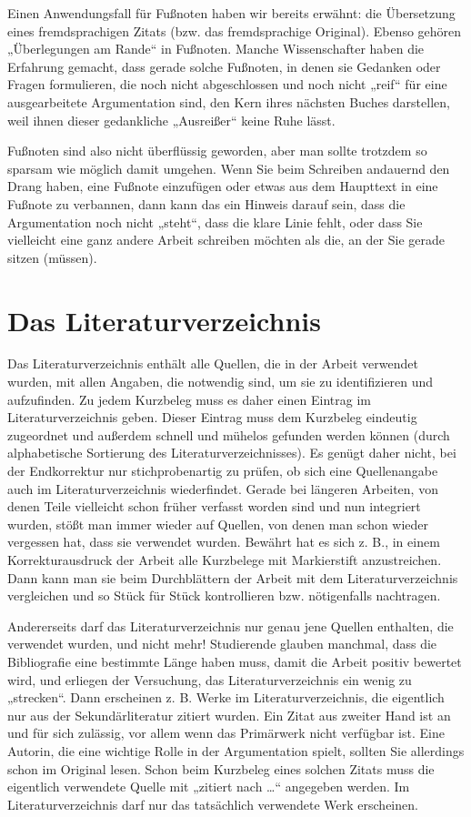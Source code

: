 \documentclass[]{book}
\theoremstyle{definition}
\theoremstyle{definition}
\theoremstyle{definition}
\theoremstyle{remark}
\begin{document}
Einen Anwendungsfall für Fußnoten haben wir bereits erwähnt: die
Übersetzung eines fremdsprachigen Zitats (bzw. das fremdsprachige
Original). Ebenso gehören „Überlegungen am Rande`` in Fußnoten. Manche
Wissenschafter haben die Erfahrung gemacht, dass gerade solche Fußnoten,
in denen sie Gedanken oder Fragen formulieren, die noch nicht
abgeschlossen und noch nicht „reif`` für eine ausgearbeitete
Argumentation sind, den Kern ihres nächsten Buches darstellen, weil
ihnen dieser gedankliche „Ausreißer`` keine Ruhe lässt.

Fußnoten sind also nicht überflüssig geworden, aber man sollte trotzdem
so sparsam wie möglich damit umgehen. Wenn Sie beim Schreiben andauernd
den Drang haben, eine Fußnote einzufügen oder etwas aus dem Haupttext in
eine Fußnote zu verbannen, dann kann das ein Hinweis darauf sein, dass
die Argumentation noch nicht „steht``, dass die klare Linie fehlt, oder
dass Sie vielleicht eine ganz andere Arbeit schreiben möchten als die,
an der Sie gerade sitzen (müssen).

\section{Das Literaturverzeichnis}\label{das-literaturverzeichnis}

Das Literaturverzeichnis enthält alle Quellen, die in der Arbeit
verwendet wurden, mit allen Angaben, die notwendig sind, um sie zu
identifizieren und aufzufinden. Zu jedem Kurzbeleg muss es daher einen
Eintrag im Literaturverzeichnis geben. Dieser Eintrag muss dem Kurzbeleg
eindeutig zugeordnet und außerdem schnell und mühelos gefunden werden
können (durch alphabetische Sortierung des Literaturverzeichnisses). Es
genügt daher nicht, bei der Endkorrektur nur stichprobenartig zu prüfen,
ob sich eine Quellenangabe auch im Literaturverzeichnis wiederfindet.
Gerade bei längeren Arbeiten, von denen Teile vielleicht schon früher
verfasst worden sind und nun integriert wurden, stößt man immer wieder
auf Quellen, von denen man schon wieder vergessen hat, dass sie
verwendet wurden. Bewährt hat es sich z. B., in einem Korrekturausdruck
der Arbeit alle Kurzbelege mit Markierstift anzustreichen. Dann kann man
sie beim Durchblättern der Arbeit mit dem Literaturverzeichnis
vergleichen und so Stück für Stück kontrollieren bzw. nötigenfalls
nachtragen.

Andererseits darf das Literaturverzeichnis nur genau jene Quellen
enthalten, die verwendet wurden, und nicht mehr! Studierende glauben
manchmal, dass die Bibliografie eine bestimmte Länge haben muss, damit
die Arbeit positiv bewertet wird, und erliegen der Versuchung, das
Literaturverzeichnis ein wenig zu „strecken``. Dann erscheinen z. B.
Werke im Literaturverzeichnis, die eigentlich nur aus der
Sekundärliteratur zitiert wurden. Ein Zitat aus zweiter Hand ist an und
für sich zulässig, vor allem wenn das Primärwerk nicht verfügbar ist.
Eine Autorin, die eine wichtige Rolle in der Argumentation spielt,
sollten Sie allerdings schon im Original lesen. Schon beim Kurzbeleg
eines solchen Zitats muss die eigentlich verwendete Quelle mit „zitiert
nach \ldots{}`` angegeben werden. Im Literaturverzeichnis darf nur das
tatsächlich verwendete Werk erscheinen.
\end{document}
